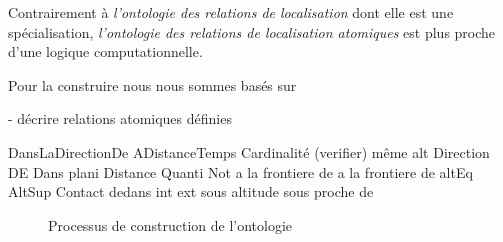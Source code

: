 Contrairement à \emph{l'ontologie des relations de localisation} dont
elle est une spécialisation, \emph{l'ontologie des relations de
  localisation atomiques} est plus proche d'une logique
computationnelle.

Pour la construire nous nous sommes basés sur

- décrire relations atomiques définies

DansLaDirectionDe
ADistanceTemps
Cardinalité (verifier)
même alt
Direction DE
Dans plani
Distance Quanti
Not a la frontiere de
a la frontiere de
altEq
AltSup
Contact
dedans
int
ext
sous altitude
sous proche de 

\begin{figure}
  \centering
  \missingfigure{}
  \caption{Processus de construction de l'ontologie}
  \label{fig:}
\end{figure}


